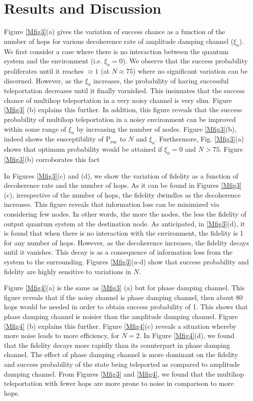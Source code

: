 \documentclass[aps,pra,twocolumn,showpacs,superscriptaddress,groupedaddress]{revtex4}
\begin{document}
\section{Results and Discussion}
Figure \ref{Mfig3}(a) gives the variation of success chance as a function of the number of hops for various decoherence rate of amplitude damping channel ($\xi_a$). We first consider a case where there is no interaction between the quantum system and the environment (i.e. $\xi_a=0$). We observe that the success probability proliferates until it reaches $\approx1$ (at $N\approx75$) where no significant variation can be discerned. However, as the $\xi_a$ increases, the probability of having successful teleportation decreases until it finally varnished. This insinuates that the success chance of multihop teleportation in a very noisy channel is very slim.  Figure  \ref{Mfig3} (b) explains this further. In addition, this figure reveals that the success probability of multihop teleportation in a noisy environment can be improved within some range of $\xi_a$ by increasing the number of nodes.  Figure \ref{Mfig3}(b), indeed shows the susceptibility of P$_{\text{suc}}$ to $N$ and $\xi_a$. Furthermore, Fig. \ref{Mfig3}(a) shows that optimum probability would be attained if $\xi_a=0$ and $N>75$. Figure \ref{Mfig3}(b) corroborates this fact

In Figures \ref{Mfig3}(c) and (d), we show the variation of fidelity as a function of decoherence rate and the number of hops. As it can be found in Figures \ref{Mfig3}(c), irrespective of the number of hops, the fidelity dwindles as the decoherence increases. This figure reveals that information loss can be minimized via considering few nodes. In other words, the more the nodes, the less the fidelity of output quantum system at the destination node. As anticipated, in \ref{Mfig3}(d), it is found that when there is no interaction with the environment, the fidelity is 1 for any number of hops. However, as the decoherence increases, the fidelity decays until it vanishes. This decay is as a consequence of information loss from the system to the surrounding. Figures \ref{Mfig3}(a-d) show that success probability and fidelity are highly sensitive to variations in $N$.

Figure \ref{Mfig4}(a) is the same as \ref{Mfig3} (a) but for phase damping channel. This ﬁgure reveals that if the noisy channel is phase damping channel, then about 80 hops would be needed in order to obtain success probability of 1. This shows that phase damping channel is noisier than the amplitude damping channel. Figure \ref{Mfig4} (b) explains this further. Figure \ref{Mfig4}(c) reveals a situation whereby more noise leads to more efficiency, for $N = 2$. In Figure \ref{Mfig4}(d), we found that the ﬁdelity decays more rapidly than its counterpart in phase damping channel. The effect of phase damping channel is more dominant on the ﬁdelity and success probability of the state being teleported as compared to amplitude damping channel. From Figures \ref{Mfig3} and \ref{Mfig4}, we found that the multihop teleportation with fewer hops are more prone to noise in comparison to more hops.
\end{document}
